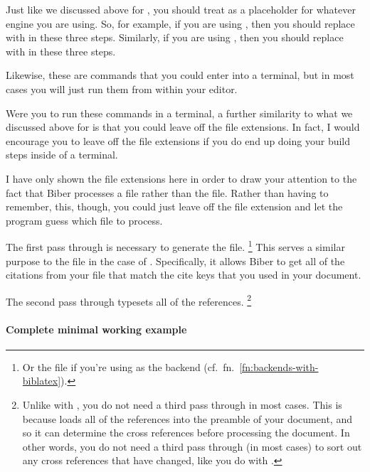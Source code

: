 Just like we discussed above for , you should treat  as a placeholder for whatever engine you are using.
So, for example, if you are using , then you should replace  with  in these three steps.
Similarly, if you are using , then you should replace  with  in these three steps.

Likewise, these are commands that you could enter into a terminal, but in most cases you will just run them from within your editor.

Were you to run these commands in a terminal, a further similarity to what we discussed above for  is that you could leave off the file extensions.
In fact, I would encourage you to leave off the file extensions if you do end up doing your build steps inside of a terminal.

I have only shown the file extensions here in order to draw your attention to the fact that Biber processes a  file rather than the  file.
Rather than having to remember, this, though, you could just leave off the file extension and let the program guess which file to process.

The first pass through  is necessary to generate the  file.%
\footnote{%
Or the  file if you're using  as the backend (cf.~fn.~\ref{fn:backends-with-biblatex}).
}
This serves a similar purpose to the  file in the case of .
Specifically, it allows Biber to get all of the citations from your  file that match the cite keys that you used in your  document.

The second pass through  typesets all of the references.%
\footnote{%
Unlike with , you do not need a third pass through  in most cases.
This is because  loads all of the references into the preamble of your document, and so it can determine the cross references before processing the document.
In other words, you do not need a third pass through  (in most cases) to sort out any cross references that have changed, like you do with .%
}

\paragraph{Complete minimal working example}

